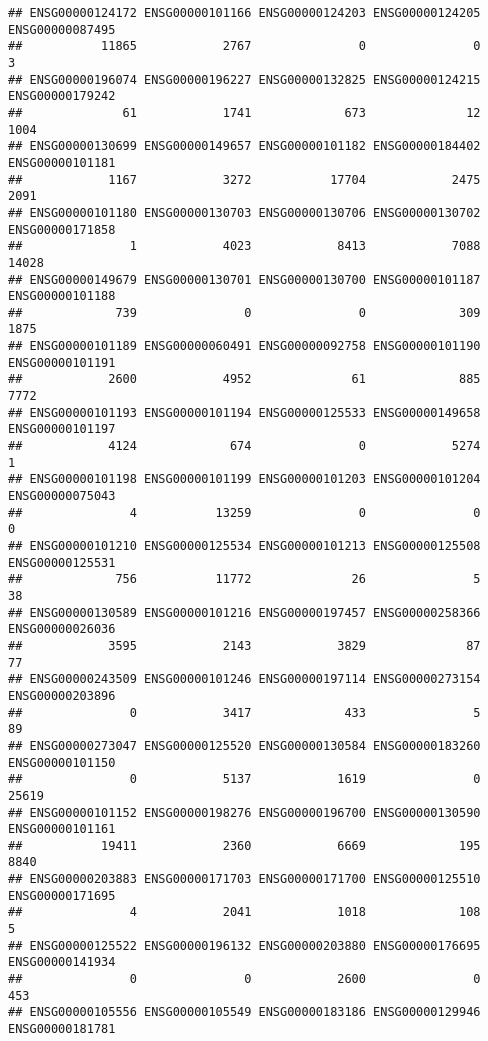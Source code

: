 \documentclass[
]{article}
\begin{document}
\begin{verbatim}
## ENSG00000124172 ENSG00000101166 ENSG00000124203 ENSG00000124205 ENSG00000087495 
##           11865            2767               0               0               3 
## ENSG00000196074 ENSG00000196227 ENSG00000132825 ENSG00000124215 ENSG00000179242 
##              61            1741             673              12            1004 
## ENSG00000130699 ENSG00000149657 ENSG00000101182 ENSG00000184402 ENSG00000101181 
##            1167            3272           17704            2475            2091 
## ENSG00000101180 ENSG00000130703 ENSG00000130706 ENSG00000130702 ENSG00000171858 
##               1            4023            8413            7088           14028 
## ENSG00000149679 ENSG00000130701 ENSG00000130700 ENSG00000101187 ENSG00000101188 
##             739               0               0             309            1875 
## ENSG00000101189 ENSG00000060491 ENSG00000092758 ENSG00000101190 ENSG00000101191 
##            2600            4952              61             885            7772 
## ENSG00000101193 ENSG00000101194 ENSG00000125533 ENSG00000149658 ENSG00000101197 
##            4124             674               0            5274               1 
## ENSG00000101198 ENSG00000101199 ENSG00000101203 ENSG00000101204 ENSG00000075043 
##               4           13259               0               0               0 
## ENSG00000101210 ENSG00000125534 ENSG00000101213 ENSG00000125508 ENSG00000125531 
##             756           11772              26               5              38 
## ENSG00000130589 ENSG00000101216 ENSG00000197457 ENSG00000258366 ENSG00000026036 
##            3595            2143            3829              87              77 
## ENSG00000243509 ENSG00000101246 ENSG00000197114 ENSG00000273154 ENSG00000203896 
##               0            3417             433               5              89 
## ENSG00000273047 ENSG00000125520 ENSG00000130584 ENSG00000183260 ENSG00000101150 
##               0            5137            1619               0           25619 
## ENSG00000101152 ENSG00000198276 ENSG00000196700 ENSG00000130590 ENSG00000101161 
##           19411            2360            6669             195            8840 
## ENSG00000203883 ENSG00000171703 ENSG00000171700 ENSG00000125510 ENSG00000171695 
##               4            2041            1018             108               5 
## ENSG00000125522 ENSG00000196132 ENSG00000203880 ENSG00000176695 ENSG00000141934 
##               0               0            2600               0             453 
## ENSG00000105556 ENSG00000105549 ENSG00000183186 ENSG00000129946 ENSG00000181781 

\end{verbatim}
\end{document}
